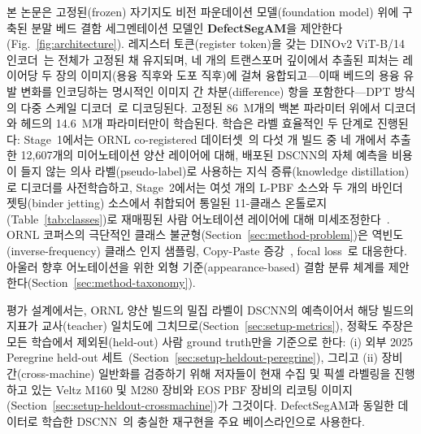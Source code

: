 본 논문은 고정된(frozen) 자기지도 비전 파운데이션 모델(foundation model) 위에
구축된 분말 베드 결함 세그멘테이션 모델인 \textbf{DefectSegAM}을
제안한다(Fig.~\ref{fig:architecture}). 레지스터 토큰(register token)을 갖는
DINOv2 ViT-B/14 인코더~\cite{Oquab2024DINOv2,Darcet2024Registers}는 전체가
고정된 채 유지되며, 네 개의 트랜스포머 깊이에서 추출된 피처는 레이어당 두
장의 이미지(용융 직후와 도포 직후)에 걸쳐 융합되고---이때 베드의 용융 유발
변화를 인코딩하는 명시적인 이미지 간 차분(difference) 항을 포함한다---DPT
방식의 다중 스케일 디코더~\cite{Ranftl2021DPT}로 디코딩된다. 고정된 86~M개의
백본 파라미터 위에서 디코더와 헤드의 14.6~M개 파라미터만이 학습된다. 학습은
라벨 효율적인 두 단계로 진행된다: Stage~1에서는 ORNL co-registered
데이터셋~\cite{ORNL_CoRegistered_Dataset}의 다섯 개 빌드 중 네 개에서 추출한
12{,}607개의 미어노테이션 양산 레이어에 대해, 배포된 DSCNN의 자체 예측을
비용이 들지 않는 의사 라벨(pseudo-label)로 사용하는 지식 증류(knowledge
distillation)로 디코더를 사전학습하고, Stage~2에서는 여섯 개의 L-PBF 소스와
두 개의 바인더 젯팅(binder jetting) 소스에서 취합되어 통일된 11-클래스
온톨로지(Table~\ref{tab:classes})로 재매핑된 사람 어노테이션 레이어에 대해
미세조정한다~\cite{Peregrine_v2021_03,Peregrine_v2022_10}. ORNL 코퍼스의
극단적인 클래스 불균형(Section~\ref{sec:method-problem})은
역빈도(inverse-frequency) 클래스 인지 샘플링, Copy-Paste
증강~\cite{Ghiasi2021CopyPaste}, focal
loss~\cite{Lin2017FocalLoss}로 대응한다. 아울러 향후 어노테이션을 위한
외형 기준(appearance-based) 결함 분류 체계를
제안한다(Section~\ref{sec:method-taxonomy}).

평가 설계에서는, ORNL 양산 빌드의 밀집 라벨이 DSCNN의 예측이어서 해당 빌드의
지표가 교사(teacher) 일치도에 그치므로(Section~\ref{sec:setup-metrics}), 정확도
주장은 모든 학습에서 제외된(held-out) 사람 ground truth만을 기준으로 한다:
(i) 외부 2025 Peregrine held-out
세트~\cite{Peregrine_v2025_TODO}(Section~\ref{sec:setup-heldout-peregrine}),
그리고 (ii) 장비 간(cross-machine) 일반화를 검증하기 위해 저자들이 현재
수집 및 픽셀 라벨링을 진행하고 있는 Veltz M160 및 M280 장비와 EOS PBF
장비의 리코팅 이미지(Section~\ref{sec:setup-heldout-crossmachine})가
그것이다. DefectSegAM과 동일한 데이터로 학습한
DSCNN~\cite{Scime2020DSCNN}의 충실한 재구현을 주요 베이스라인으로 사용한다. 

